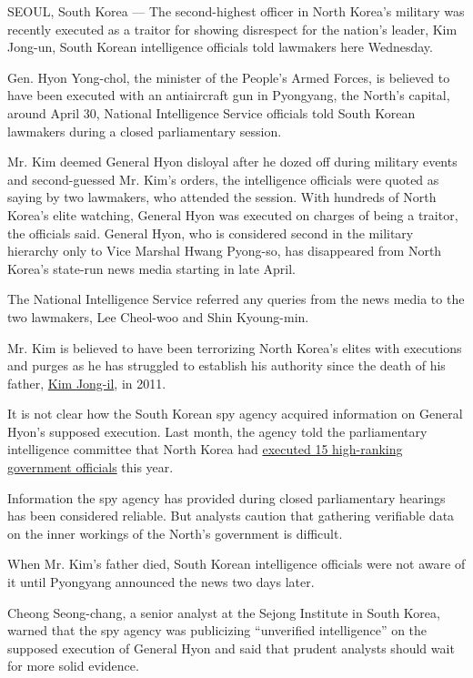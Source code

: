 SEOUL, South Korea --- The second-highest officer in North Korea's
military was recently executed as a traitor for showing disrespect for
the nation's leader, Kim Jong-un, South Korean intelligence officials
told lawmakers here Wednesday.

Gen. Hyon Yong-chol, the minister of the People's Armed Forces, is
believed to have been executed with an antiaircraft gun in Pyongyang,
the North's capital, around April 30, National Intelligence Service
officials told South Korean lawmakers during a closed parliamentary
session.

Mr. Kim deemed General Hyon disloyal after he dozed off during military
events and second-guessed Mr. Kim's orders, the intelligence officials
were quoted as saying by two lawmakers, who attended the session. With
hundreds of North Korea's elite watching, General Hyon was executed on
charges of being a traitor, the officials said. General Hyon, who is
considered second in the military hierarchy only to Vice Marshal Hwang
Pyong-so, has disappeared from North Korea's state-run news media
starting in late April.

The National Intelligence Service referred any queries from the news
media to the two lawmakers, Lee Cheol-woo and Shin Kyoung-min.

Mr. Kim is believed to have been terrorizing North Korea's elites with
executions and purges as he has struggled to establish his authority
since the death of his father,
\href{http://www.nytimes3xbfgragh.onion/2011/12/19/world/asia/kim-jong-il-is-dead.html?pagewanted=all}{Kim
Jong-il}, in 2011.

It is not clear how the South Korean spy agency acquired information on
General Hyon's supposed execution. Last month, the agency told the
parliamentary intelligence committee that North Korea had
\href{http://www.nytimes3xbfgragh.onion/2015/04/30/world/asia/north-korea-executed-15-top-officials-in-2015-south-korean-agency-says.html}{executed
15 high-ranking government officials} this year.

Information the spy agency has provided during closed parliamentary
hearings has been considered reliable. But analysts caution that
gathering verifiable data on the inner workings of the North's
government is difficult.

When Mr. Kim's father died, South Korean intelligence officials were not
aware of it until Pyongyang announced the news two days later.

Cheong Seong-chang, a senior analyst at the Sejong Institute in South
Korea, warned that the spy agency was publicizing ``unverified
intelligence'' on the supposed execution of General Hyon and said that
prudent analysts should wait for more solid evidence.

